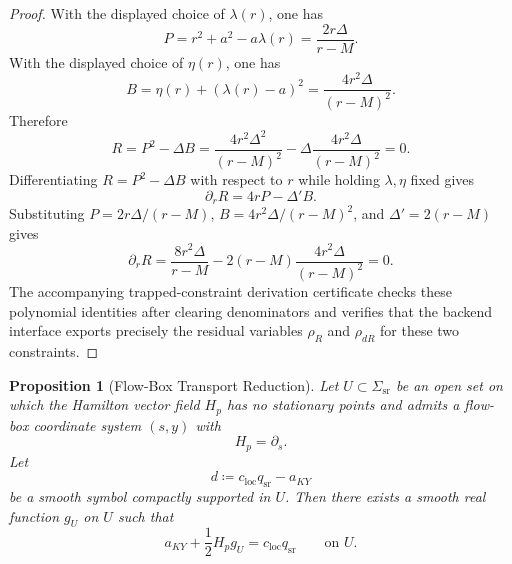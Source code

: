 \documentclass[12pt,a4paper]{article}
\newtheorem{proposition}[theorem]{Proposition}
\begin{document}
\begin{proof}
With the displayed choice of $\lambda(r)$, one has
\begin{equation}
P=r^2+a^2-a\lambda(r)=\frac{2r\Delta}{r-M}.
\end{equation}
With the displayed choice of $\eta(r)$, one has
\begin{equation}
B=\eta(r)+(\lambda(r)-a)^2=\frac{4r^2\Delta}{(r-M)^2}.
\end{equation}
Therefore
\begin{equation}
R=P^2-\Delta B
= \frac{4r^2\Delta^2}{(r-M)^2}
-\Delta\frac{4r^2\Delta}{(r-M)^2}=0.
\end{equation}
Differentiating $R=P^2-\Delta B$ with respect to $r$ while holding $\lambda,\eta$ fixed gives
\begin{equation}
\partial_r R=4rP-\Delta' B.
\end{equation}
Substituting $P=2r\Delta/(r-M)$, $B=4r^2\Delta/(r-M)^2$, and $\Delta'=2(r-M)$ gives
\begin{equation}
\partial_r R
=\frac{8r^2\Delta}{r-M}
-2(r-M)\frac{4r^2\Delta}{(r-M)^2}=0.
\end{equation}
The accompanying trapped-constraint derivation certificate checks these polynomial identities after clearing denominators and verifies that the backend interface exports precisely the residual variables $\rho_R$ and $\rho_{dR}$ for these two constraints.
\end{proof}

\begin{proposition}[Flow-Box Transport Reduction]\label{prop:flowbox-transport}
Let $U \subset \Sigma_{\mathrm{sr}}$ be an open set on which the Hamilton vector field $H_p$ has no stationary points and admits a flow-box coordinate system $(s,y)$ with
\begin{equation}
H_p = \partial_s.
\end{equation}
Let
\begin{equation}
d \coloneqq c_{\mathrm{loc}} q_{\mathrm{sr}} - a_{KY}
\end{equation}
be a smooth symbol compactly supported in $U$. Then there exists a smooth real function $g_U$ on $U$ such that
\begin{equation}
a_{KY} + \frac12 H_p g_U = c_{\mathrm{loc}} q_{\mathrm{sr}}
\qquad \text{on } U.
\end{equation}
\end{proposition}
\end{document}
